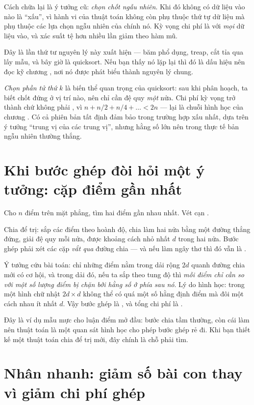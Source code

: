 \documentclass[../../algorithm.tex]{subfiles}
\begin{document}
Cách chữa lại là ý tưởng cũ: \emph{chọn chốt ngẫu nhiên}. Khi đó không có dữ liệu vào nào là ``xấu'', vì hành vi của thuật toán không còn phụ thuộc thứ tự dữ liệu mà phụ thuộc các lựa chọn ngẫu nhiên của chính nó. Kỳ vọng chi phí là  với \emph{mọi} dữ liệu vào, và xác suất tệ hơn nhiều lần giảm theo hàm mũ.

Đây là lần thứ tư nguyên lý này xuất hiện --- băm phổ dụng, treap, cắt tỉa qua lấy mẫu, và bây giờ là quicksort. Nếu bạn thấy nó lặp lại thì đó là dấu hiệu nên đọc kỹ chương , nơi nó được phát biểu thành nguyên lý chung.

\emph{Chọn phần tử thứ \(k\)} là biến thể quan trọng của quicksort: sau khi phân hoạch, ta biết chốt đứng ở vị trí nào, nên chỉ cần đệ quy \emph{một} nửa. Chi phí kỳ vọng trở thành  chứ không phải , vì \(n + n/2 + n/4 + \dots < 2n\) --- lại là chuỗi hình học của chương . Có cả phiên bản tất định đảm bảo  trong trường hợp xấu nhất, dựa trên ý tưởng ``trung vị của các trung vị''\cite{blum1973}, nhưng hằng số lớn nên trong thực tế bản ngẫu nhiên thường thắng.

\section{Khi bước ghép đòi hỏi một ý tưởng: cặp điểm gần nhất}

Cho \(n\) điểm trên mặt phẳng, tìm hai điểm gần nhau nhất. Vét cạn .

Chia để trị: sắp các điểm theo hoành độ, chia làm hai nửa bằng một đường thẳng đứng, giải đệ quy mỗi nửa, được khoảng cách nhỏ nhất \(d\) trong hai nửa. Bước ghép phải xét các cặp \emph{vắt qua} đường chia --- và nếu làm ngây thơ thì đó vẫn là .

Ý tưởng cứu bài toán: chỉ những điểm nằm trong dải rộng \(2d\) quanh đường chia mới có cơ hội, và trong dải đó, nếu ta sắp theo tung độ thì \emph{mỗi điểm chỉ cần so với một số lượng điểm bị chặn bởi hằng số ở phía sau nó}. Lý do hình học: trong một hình chữ nhật \(2d \times d\) không thể có quá một số hằng định điểm mà đôi một cách nhau ít nhất \(d\). Vậy bước ghép là , và tổng chi phí là .

Đây là ví dụ mẫu mực cho luận điểm mở đầu: bước chia tầm thường, còn cái làm nên thuật toán là một quan sát hình học cho phép bước ghép rẻ đi. Khi bạn thiết kế một thuật toán chia để trị mới, đây chính là chỗ phải tìm.

\section{Nhân nhanh: giảm số bài con thay vì giảm chi phí ghép}
\end{document}
